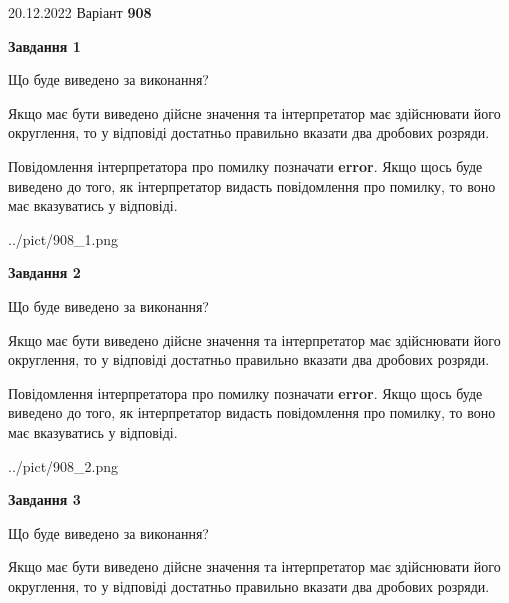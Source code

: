 \documentclass[12pt, ukrainian]{article}
\begin{document}
{20.12.2022 Варіант \No \textbf { 908 }\par}
{
\begin {Large}

{\begin {center}\textbf{Завдання 1}\end {center}}\par
Що буде виведено за виконання? \par

Якщо має бути виведено дійсне значення та інтерпретатор має здійснювати його округлення, 
то у відповіді достатньо правильно вказати два дробових розряди.

Повідомлення інтерпретатора про помилку позначати \textbf{error}.
Якщо щось буде виведено до того, як інтерпретатор видасть повідомлення про помилку, 
то воно має вказуватись у відповіді. \par

\begin{center}
	{../pict/908_1.png}
\end{center}
\newpage

{\begin {center}\textbf{Завдання 2}\end {center}}\par
Що буде виведено за виконання? \par

Якщо має бути виведено дійсне значення та інтерпретатор має здійснювати його округлення, 
то у відповіді достатньо правильно вказати два дробових розряди.

Повідомлення інтерпретатора про помилку позначати \textbf{error}.
Якщо щось буде виведено до того, як інтерпретатор видасть повідомлення про помилку, 
то воно має вказуватись у відповіді. \par

\begin{center}
	{../pict/908_2.png}
\end{center}
\newpage

{\begin {center}\textbf{Завдання 3}\end {center}}\par
Що буде виведено за виконання? \par

Якщо має бути виведено дійсне значення та інтерпретатор має здійснювати його округлення, 
то у відповіді достатньо правильно вказати два дробових розряди.


\end{Large}}
\end{document}
